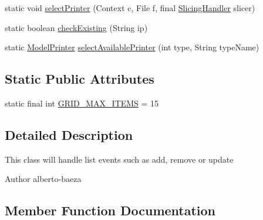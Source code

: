 \begin{DoxyCompactItemize}
\item 
static void \hyperlink{classandroid_1_1app_1_1printerapp_1_1devices_1_1_devices_list_controller_a569eb18602c84ff12b1fcb152a3ad0cf}{select\+Printer} (Context c, File f, final \hyperlink{classandroid_1_1app_1_1printerapp_1_1viewer_1_1_slicing_handler}{Slicing\+Handler} slicer)
\item 
static boolean \hyperlink{classandroid_1_1app_1_1printerapp_1_1devices_1_1_devices_list_controller_a74e20d472061480b4d3ad1e3d41560c8}{check\+Existing} (String ip)
\item 
static \hyperlink{classandroid_1_1app_1_1printerapp_1_1model_1_1_model_printer}{Model\+Printer} \hyperlink{classandroid_1_1app_1_1printerapp_1_1devices_1_1_devices_list_controller_a6790f1c500e6a97ed1f4b93dbb7b5a09}{select\+Available\+Printer} (int type, String type\+Name)
\end{DoxyCompactItemize}
\subsection*{Static Public Attributes}
\begin{DoxyCompactItemize}
\item 
static final int \hyperlink{classandroid_1_1app_1_1printerapp_1_1devices_1_1_devices_list_controller_a146668de386ede76b9fd4fb9ca6127fc}{G\+R\+I\+D\+\_\+\+M\+A\+X\+\_\+\+I\+T\+E\+MS} = 15
\end{DoxyCompactItemize}


\subsection{Detailed Description}
This class will handle list events such as add, remove or update

\begin{DoxyAuthor}{Author}
alberto-\/baeza 
\end{DoxyAuthor}


\subsection{Member Function Documentation}
\mbox{\label{classandroid_1_1app_1_1printerapp_1_1devices_1_1_devices_list_controller_aa698432b0468844d55ae863154ec3195}} 
